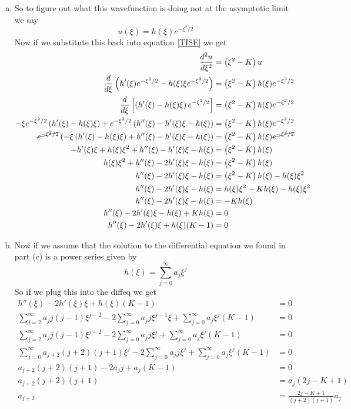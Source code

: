 \documentclass[11pt]{article}
\numberwithin{equation}{section}
\begin{document}
\begin{enumerate}[(a)]
\item
So to figure out what this wavefunction is doing not at the asymptotic limit we say
$$u(\xi) = h(\xi)e^{-\xi^2/2}$$
Now if we substitute this back into equation \ref{TISE} we get
\begin{align*}
\frac{d^2u}{d\xi^2} &= \left(\xi^2 - K\right)u\\
\frac{d}{d\xi}\left(h'(\xi)e^{-\xi^2/2}- h(\xi)\xi e^{-\xi^2/2}\right) &= \left(\xi^2 - K\right)h(\xi)e^{-\xi^2/2}\\
\frac{d}{d\xi}\left[\left(h'(\xi)- h(\xi)\xi\right)e^{-\xi^2/2}\right] &= \left(\xi^2 - K\right)h(\xi)e^{-\xi^2/2}\\
-\xi e^{-\xi^2/2}\left(h'(\xi)- h(\xi)\xi\right) + e^{-\xi^2/2}\left(h''(\xi) - h'(\xi)\xi - h(\xi)\right)  &= \left(\xi^2 - K\right)h(\xi)e^{-\xi^2/2}\\
\cancel{e^{-\xi^2/2}}\left(-\xi\left(h'(\xi)- h(\xi)\xi\right) + h''(\xi) - h'(\xi)\xi - h(\xi)\right)  &= \left(\xi^2 - K\right)h(\xi)\cancel{e^{-\xi^2/2}}\\
-h'(\xi)\xi + h(\xi)\xi^2 + h''(\xi) - h'(\xi)\xi - h(\xi)  &= \left(\xi^2 - K\right)h(\xi)\\
h(\xi)\xi^2 + h''(\xi) -2h'(\xi)\xi - h(\xi)  &= \left(\xi^2 - K\right)h(\xi)\\
h''(\xi) -2h'(\xi)\xi - h(\xi)  &= \left(\xi^2 - K\right)h(\xi)-h(\xi)\xi^2\\
h''(\xi) -2h'(\xi)\xi - h(\xi)  &= h(\xi)\xi^2 - Kh(\xi)-h(\xi)\xi^2\\
h''(\xi) -2h'(\xi)\xi - h(\xi)  &= -Kh(\xi)\\
h''(\xi) -2h'(\xi)\xi - h(\xi) + Kh(\xi) &= 0\\
h''(\xi) -2h'(\xi)\xi + h(\xi)(K - 1) &= 0\\
\end{align*}

\item
Now if we assume that the solution to the differential equation we found in part (c) is a power series given by
$$h(\xi) = \sum_{j=0}^{\infty}a_j\xi^j$$
So if we plug this into the diffeq we get
\begin{align*}
h''(\xi) -2h'(\xi)\xi + h(\xi)(K - 1) &= 0\\
\sum_{j=2}^{\infty}a_jj(j-1)\xi^{j-2} - 2\sum_{j=0}^{\infty}a_jj\xi^{j-1}\xi + \sum_{j=0}^{\infty}a_j\xi^j(K - 1) &= 0\\
\sum_{j=2}^{\infty}a_jj(j-1)\xi^{j-2} - 2\sum_{j=0}^{\infty}a_jj\xi^{j} + \sum_{j=0}^{\infty}a_j\xi^j(K - 1) &= 0\\
\sum_{j=0}^{\infty}a_{j+2}(j+2)(j+1)\xi^{j} - 2\sum_{j=0}^{\infty}a_jj\xi^{j} + \sum_{j=0}^{\infty}a_j\xi^j(K - 1) &= 0\\
a_{j+2}(j+2)(j+1)- 2a_jj + a_j(K - 1) &= 0\\
a_{j+2}(j+2)(j+1) &= a_j(2j - K + 1)\\
a_{j+2} &= \frac{2j - K + 1}{(j+2)(j+1)}a_j\\
\end{align*}


\end{enumerate}
\end{document}
